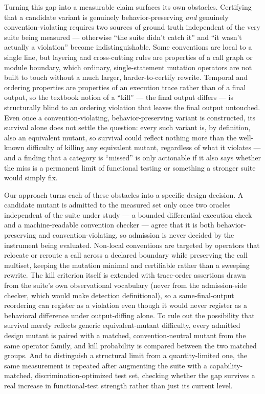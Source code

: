 \documentclass[11pt]{article}
\begin{document}
Turning this gap into a measurable claim surfaces its own obstacles. Certifying that a candidate variant is genuinely behavior-preserving \emph{and} genuinely convention-violating requires two sources of ground truth independent of the very suite being measured --- otherwise ``the suite didn't catch it'' and ``it wasn't actually a violation'' become indistinguishable. Some conventions are local to a single line, but layering and cross-cutting rules are properties of a call graph or module boundary, which ordinary, single-statement mutation operators are not built to touch without a much larger, harder-to-certify rewrite. Temporal and ordering properties are properties of an execution trace rather than of a final output, so the textbook notion of a ``kill'' --- the final output differs --- is structurally blind to an ordering violation that leaves the final output untouched. Even once a convention-violating, behavior-preserving variant is constructed, its survival alone does not settle the question: every such variant is, by definition, also an equivalent mutant, so survival could reflect nothing more than the well-known difficulty of killing any equivalent mutant, regardless of what it violates --- and a finding that a category is ``missed'' is only actionable if it also says whether the miss is a permanent limit of functional testing or something a stronger suite would simply fix.

Our approach turns each of these obstacles into a specific design decision. A candidate mutant is admitted to the measured set only once two oracles independent of the suite under study --- a bounded differential-execution check and a machine-readable convention checker --- agree that it is both behavior-preserving and convention-violating, so admission is never decided by the instrument being evaluated. Non-local conventions are targeted by operators that relocate or reroute a call across a declared boundary while preserving the call multiset, keeping the mutation minimal and certifiable rather than a sweeping rewrite. The kill criterion itself is extended with trace-order assertions drawn from the suite's own observational vocabulary (never from the admission-side checker, which would make detection definitional), so a same-final-output reordering can register as a violation even though it would never register as a behavioral difference under output-diffing alone. To rule out the possibility that survival merely reflects generic equivalent-mutant difficulty, every admitted design mutant is paired with a matched, convention-neutral mutant from the same operator family, and kill probability is compared between the two matched groups. And to distinguish a structural limit from a quantity-limited one, the same measurement is repeated after augmenting the suite with a capability-matched, discrimination-optimized test set, checking whether the gap survives a real increase in functional-test strength rather than just its current level.
\end{document}
